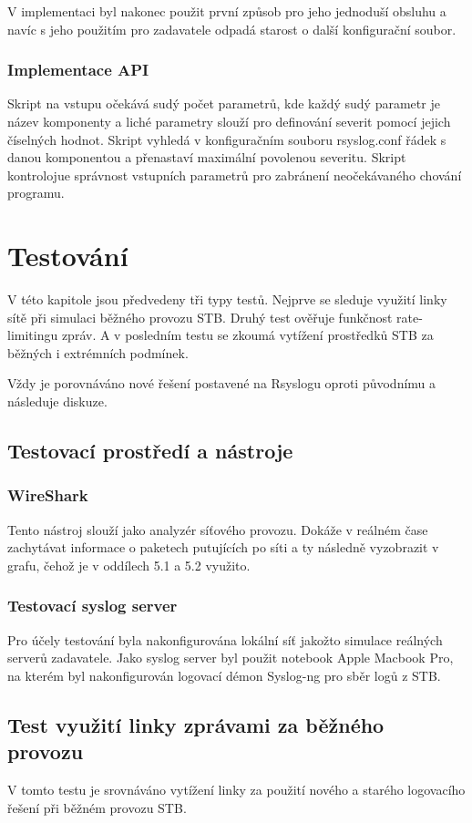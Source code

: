 \documentclass[thesis=B,czech]{FITthesis}[2012/06/26]
\begin{document}
V implementaci byl nakonec použit první způsob pro jeho jednoduší obsluhu a navíc s jeho použitím pro zadavatele odpadá starost o další konfigurační soubor.

\subsection{Implementace API}
Skript na vstupu očekává sudý počet parametrů, kde každý sudý parametr je název komponenty a liché parametry slouží pro definování severit pomocí jejich číselných hodnot.
Skript vyhledá v konfiguračním souboru rsyslog.conf řádek s danou komponentou a přenastaví maximální povolenou severitu. Skript kontrolojue správnost vstupních parametrů pro zabránení neočekávaného chování programu.

\chapter{Testování}
V této kapitole jsou předvedeny tři typy testů.
Nejprve se sleduje využití linky sítě při simulaci běžného provozu STB. Druhý test ověřuje funkčnost rate-limitingu zpráv. A v posledním testu se zkoumá vytížení prostředků STB za běžných i extrémních podmínek.

Vždy je porovnáváno nové řešení postavené na Rsyslogu oproti původnímu a následuje diskuze.

\section*{Testovací prostředí a nástroje}

\subsection*{WireShark}
Tento nástroj slouží jako analyzér síťového provozu. Dokáže v reálném čase zachytávat informace o paketech putujících po síti a ty následně vyzobrazit v grafu, čehož je v oddílech 5.1 a 5.2 využito.

\subsection*{Testovací syslog server}
Pro účely testování byla nakonfigurována lokální síť jakožto simulace reálných serverů zadavatele. Jako syslog server byl použit notebook Apple Macbook Pro, na kterém byl nakonfigurován logovací démon Syslog-ng pro sběr logů z STB.

\section{Test využití linky zprávami za běžného provozu}
 V tomto testu je srovnáváno vytížení linky za použití nového a starého logovacího řešení při běžném provozu STB. 
\end{document}

